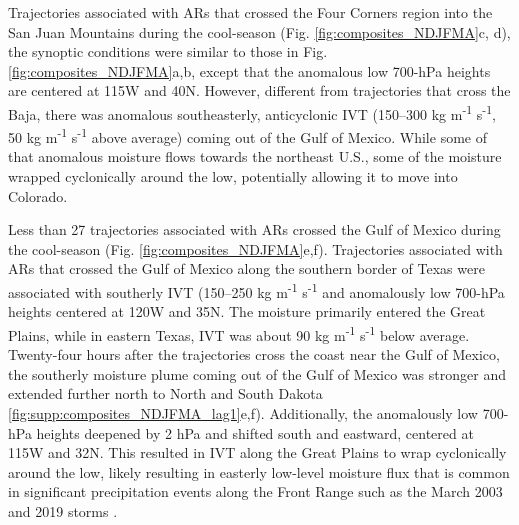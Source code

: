 \documentclass[draft]{agujournal2019}
\begin{document}
Trajectories associated with ARs that crossed the Four Corners region into the San Juan Mountains during the cool-season (Fig. \ref{fig:composites_NDJFMA}c, d), the synoptic conditions were similar to those in Fig. \ref{fig:composites_NDJFMA}a,b, except that the anomalous low 700-hPa heights are centered at 115\textdegree W and 40\textdegree N. However, different from trajectories that cross the Baja, there was anomalous southeasterly, anticyclonic IVT (150--300 kg m\textsuperscript{-1} s\textsuperscript{-1}, 50 kg m\textsuperscript{-1} s\textsuperscript{-1} above average) coming out of the Gulf of Mexico. While some of that anomalous moisture flows towards the northeast U.S., some of the moisture wrapped cyclonically around the low, potentially allowing it to move into Colorado. 

Less than 27 trajectories associated with ARs crossed the Gulf of Mexico during the cool-season (Fig. \ref{fig:composites_NDJFMA}e,f). Trajectories associated with ARs that crossed the Gulf of Mexico along the southern border of Texas were associated with southerly IVT (150--250 kg m\textsuperscript{-1} s\textsuperscript{-1} and anomalously low 700-hPa heights centered at 120\textdegree W and 35\textdegree N. The moisture primarily entered the Great Plains, while in eastern Texas, IVT was about 90 kg m\textsuperscript{-1} s\textsuperscript{-1} below average. Twenty-four hours after the trajectories cross the coast near the Gulf of Mexico, the southerly moisture plume coming out of the Gulf of Mexico was stronger and extended further north to North and South Dakota \ref{fig:supp:composites_NDJFMA_lag1}e,f). Additionally, the anomalously low 700-hPa heights deepened by 2 hPa and shifted south and eastward, centered at 115\textdegree W and 32\textdegree N. This resulted in IVT along the Great Plains to wrap cyclonically around the low, likely resulting in easterly low-level moisture flux that is common in significant precipitation events along the Front Range such as the March 2003 and 2019 storms \cite{Wesley2013Extreme2003, Zou2024A2019}. 
\end{document}
